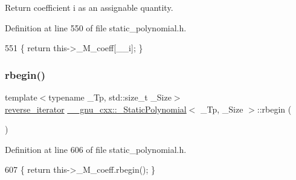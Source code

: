 Return coefficient {\ttfamily i} as an assignable quantity. 

Definition at line 550 of file static\+\_\+polynomial.\+h.


\begin{DoxyCode}
551       \{ \textcolor{keywordflow}{return} this->\_M\_coeff[\_\_i]; \}
\end{DoxyCode}
\mbox{\label{class____gnu__cxx_1_1__StaticPolynomial_ad26b5676e30705aae3ff051f149e52df}} 
\subsubsection{\texorpdfstring{rbegin()}{rbegin()}\hspace{0.1cm}{\footnotesize\ttfamily [1/2]}}
{\footnotesize\ttfamily template$<$typename \+\_\+\+Tp, std\+::size\+\_\+t \+\_\+\+Size$>$ \\
\hyperlink{class____gnu__cxx_1_1__StaticPolynomial_a6313ff2d9e03c7911016595440c6a2ae}{reverse\+\_\+iterator} \hyperlink{class____gnu__cxx_1_1__StaticPolynomial}{\+\_\+\+\_\+gnu\+\_\+cxx\+::\+\_\+\+Static\+Polynomial}$<$ \+\_\+\+Tp, \+\_\+\+Size $>$\+::rbegin (\begin{DoxyParamCaption}{ }\end{DoxyParamCaption})\hspace{0.3cm}{\ttfamily [inline]}}



Definition at line 606 of file static\+\_\+polynomial.\+h.


\begin{DoxyCode}
607       \{ \textcolor{keywordflow}{return} this->\_M\_coeff.rbegin(); \}
\end{DoxyCode}
\mbox{\label{class____gnu__cxx_1_1__StaticPolynomial_a53306b159074b3eec382432137a4d297}} 
